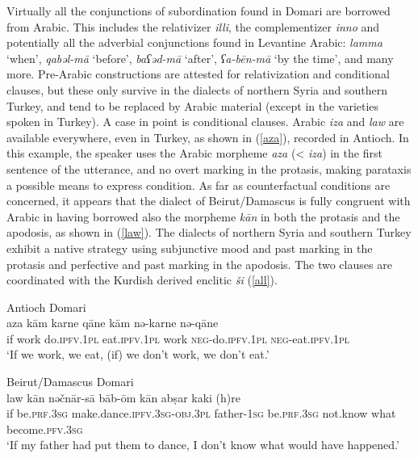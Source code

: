 \documentclass[output=paper]{langsci/langscibook}
\begin{document}
Virtually all the conjunctions of subordination found in Domari are borrowed from Arabic. This includes the relativizer \textit{illi}, the complementizer \textit{inno} and potentially all the adverbial conjunctions found in Levantine Arabic: \textit{lamma} ‘when’, \textit{qabəl-mā} ‘before’, \textit{baʕəd-mā} ‘after’, \textit{ʕa-bēn-mā} ‘by the time’, and many more. Pre-Arabic constructions are attested for relativization and conditional clauses, but these only survive in the dialects of northern Syria and southern Turkey, and tend to be replaced by Arabic material (except in the varieties spoken in Turkey). A case in point is conditional clauses. Arabic \textit{iza} and \textit{law} are available everywhere, even in Turkey, as shown in (\ref{aza}), recorded in Antioch. In this example, the speaker uses the Arabic morpheme \textit{aza} (< \textit{iza}) in the first sentence of the utterance, and no overt marking in the protasis, making parataxis a possible means to express condition. As far as counterfactual conditions are concerned, it appears that the dialect of Beirut/Damascus is fully congruent with Arabic in having borrowed also the morpheme \textit{kān} in both the protasis and the apodosis, as shown in (\ref{law}). The dialects of northern Syria and southern Turkey exhibit a native strategy using subjunctive mood and past marking in the protasis and perfective and past marking in the apodosis. The two clauses are coordinated with the Kurdish derived enclitic \textit{ši} (\ref{all}).

\ea \label{aza}
{Antioch Domari}\\
\gll aza kām karne qāne kām nə-karne nə-qāne\\
     if work do.\textsc{ipfv.1pl} eat.\textsc{ipfv.1pl} work \textsc{neg}{}-do.\textsc{ipfv.1pl} \textsc{neg}{}-eat.\textsc{ipfv.1pl}\\
\glt ‘If we work, we eat, (if) we don’t work, we don’t eat.’
\z

\ea \label{law}
{Beirut/Damascus Domari}\\
\gll law kān nəčnār-sā bāb-ōm kān abṣar kaki (h)re\\
     if be.\textsc{prf.3sg} make.dance\textsc{.ipfv.3sg-obj.3pl} father-\textsc{1sg} be.\textsc{prf.3sg} not.know what become.\textsc{pfv.3sg}\\
\glt ‘If my father had put them to dance, I don’t know what would have happened.’
\z
{}
\end{document}
